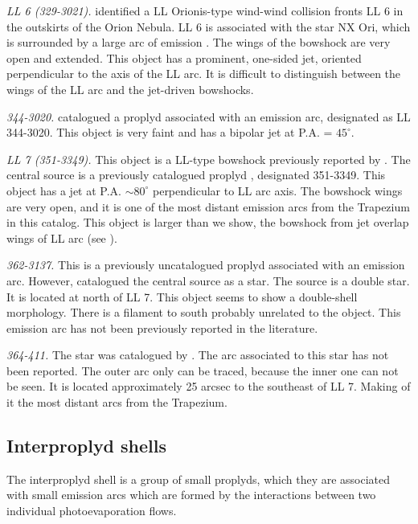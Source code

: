 \documentclass[apj, twocolumn]{aastex63}
\renewcommand\clearpage{}
\begin{document}
\textit{LL 6 (329-3021).} \citep{Bally:2001a} identified a LL Orionis-type
wind-wind collision fronts LL 6 in the outskirts of the Orion Nebula. LL 6
is associated with the star NX Ori, which is surrounded by a large arc of
emission \citep{Bally:2006a}. The wings of the bowshock are very open and
extended. This object has a prominent, one-sided jet, oriented perpendicular
to the axis of the LL arc. It is difficult to distinguish between the wings
of the LL arc and the jet-driven bowshocks.    

\textit{344-3020.} \citet{Bally:2006a} catalogued a proplyd associated
with an emission arc, designated as LL 344-3020. This object is very faint
and has a bipolar jet at P.A. = $45^{\circ}$.     

\textit{LL 7 (351-3349).} This object is a LL-type bowshock previously
reported by \citet{Bally:2001a}. The central source is a previously
catalogued proplyd \citep{Ricci:2008a}, designated 351-3349. This object
has a jet at P.A. $\sim 80^{\circ}$ perpendicular to LL arc axis. The
bowshock wings are very open, and it is one of the most distant emission
arcs from the Trapezium in this catalog. This object is larger than we show,
the bowshock from jet overlap wings of LL arc (see \citealp{Bally:2001a}).   

\textit{362-3137.} This is a previously uncatalogued proplyd associated
with an emission arc. However, \citet{Da-Rio:2009a} catalogued the
central source as a star. The source is a double star. It is located at
north of LL 7. This object seems to show a double-shell morphology.
There is a filament to south probably unrelated to the object. This
emission arc has not been previously reported in the literature.

\textit{364-411.} The star was catalogued by \citet{Hillenbrand:1997}.
The arc associated to this star has not been reported. The outer
arc only can be traced, because the inner one can not be seen.
It is located approximately 25 arcsec to the southeast of LL 7.
Making of it the most distant arcs from the Trapezium.

\clearpage
\subsection{Interproplyd shells}
\label{sec:interproplyd-group}



The interproplyd shell is a  group of small proplyds, which they are
associated with small emission arcs which are formed by the interactions
between two individual photoevaporation flows.
    
\end{document}
